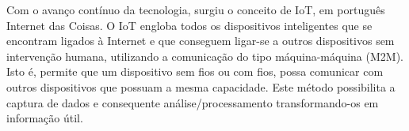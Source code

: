 
















Com o avanço contínuo da tecnologia, surgiu o conceito de \ac{IoT}, em português Internet das Coisas. O \ac{IoT} engloba todos os dispositivos inteligentes que se encontram ligados à Internet e que conseguem ligar-se a outros dispositivos sem intervenção humana, utilizando a comunicação do tipo máquina-máquina (M2M). Isto é, permite que um dispositivo sem fios ou com fios, possa comunicar com outros dispositivos que possuam a mesma capacidade. Este método possibilita a captura de dados e consequente análise/processamento transformando-os em informação útil\cite{Li2015}. 

